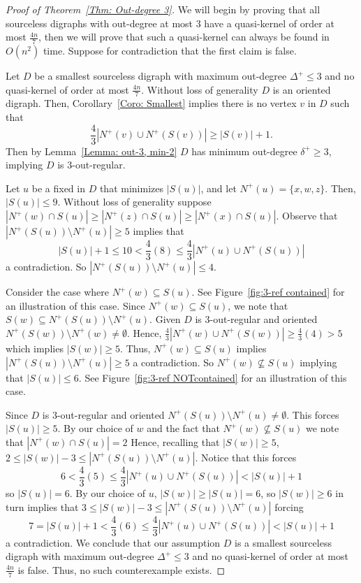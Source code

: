 \documentclass[12pt]{article}
\theoremstyle{definition}
\begin{document}
\begin{proof}[Proof of Theorem~\ref{Thm: Out-degree 3}]
    We will begin by proving that all sourceless digraphs with out-degree at most $3$ have a quasi-kernel of order at most
    $\frac{4n}{7}$, then we will prove that such a quasi-kernel can always be found in $O(n^2)$ time.
    Suppose for contradiction that the first claim is false.
    
    Let $D$ be a smallest sourceless digraph with maximum out-degree $\Delta^+ \leq 3$
    and no quasi-kernel of order at most $\frac{4n}{7}$.
    Without loss of generality $D$ is an oriented digraph.
    Then, Corollary~\ref{Coro: Smallest} implies there is no vertex $v$ in $D$ such
    that 
    \[
    \frac{4}{3}|N^+(v) \cup N^+(S(v))| \geq |S(v)|+1.
    \]
    Then by Lemma~\ref{Lemma: out-3, min-2} $D$ has minimum out-degree $\delta^+ \geq 3$,
    implying $D$ is $3$-out-regular.

    Let $u$ be a fixed in $D$ that minimizes $|S(u)|$,
    and let $N^+(u) = \{x,w,z\}$.
    Then, $|S(u)|\leq 9$.
    Without loss of generality suppose $|N^+(w)\cap S(u)|\geq |N^+(z)\cap S(u)|\geq |N^+(x)\cap S(u)|$.
    Observe that $|N^+(S(u))\setminus N^+(u)| \geq 5$ implies
    that
    \[
    |S(u)|+1 \leq 10 < \frac{4}{3}(8) \leq \frac{4}{3}|N^+(u)\cup N^+(S(u))|
    \]
    a contradiction.
    So $|N^+(S(u))\setminus N^+(u)| \leq 4$.

    Consider the case where $N^+(w) \subseteq S(u)$.
    See Figure~\ref{fig:3-ref contained} for an illustration of this case.
    Since $N^+(w) \subseteq S(u)$, we note that $S(w) \subseteq N^+(S(u))\setminus N^+(u)$.
    Given $D$ is $3$-out-regular and oriented $N^+(S(w))\setminus N^+(w) \neq \emptyset$.
    Hence, 
    $\frac{4}{3}|N^+(w)\cup N^+(S(w))|\geq \frac{4}{3}(4)>5$
    which implies $|S(w)|\geq 5$.
    Thus, 
    $N^+(w) \subseteq S(u)$ implies $|N^+(S(u))\setminus N^+(u)| \geq 5$
    a contradiction.
    So $N^+(w) \not\subseteq S(u)$
    implying that $|S(u)|\leq 6$.
    See Figure~\ref{fig:3-ref NOTcontained} for an illustration of this case.

    Since $D$ is $3$-out-regular and oriented $N^+(S(u))\setminus N^+(u) \neq \emptyset$.
    This forces $|S(u)|\geq 5$.
    By our choice of $w$ and the fact that $N^+(w) \not\subseteq S(u)$
    we note that $|N^+(w)\cap S(u)| = 2$
    Hence, recalling that $|S(w)|\geq 5$,
    $
    2 \leq |S(w)|-3 \leq |N^+(S(u))\setminus N^+(u)|.
    $
    Notice that this forces 
    \[
    6 < \frac{4}{3}(5) \leq \frac{4}{3}|N^+(u)\cup N^+(S(u))| < |S(u)|+1
    \]
    so $|S(u)| = 6$.
    By our choice of $u$, $|S(w)|\geq |S(u)| = 6$, 
    so $|S(w)|\geq 6$ in turn implies that 
    $
    3 \leq |S(w)|-3 \leq |N^+(S(u))\setminus N^+(u)|
    $
    forcing
    \[
    7 = |S(u)|+ 1< \frac{4}{3}(6) \leq \frac{4}{3}|N^+(u)\cup N^+(S(u))| < |S(u)|+1
    \]
    a contradiction.
    We conclude that our assumption 
    $D$ is a smallest sourceless digraph with maximum out-degree $\Delta^+ \leq 3$
    and no quasi-kernel of order at most $\frac{4n}{7}$ is false.
    Thus, no such counterexample exists.
\end{proof}
\end{document}
